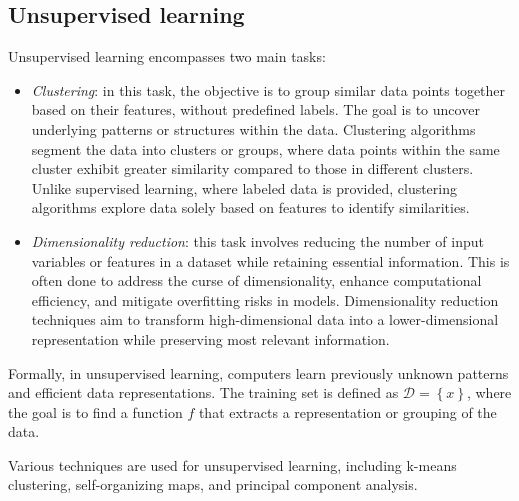 \subsection{Unsupervised learning}
Unsupervised learning encompasses two main tasks:
\begin{itemize}
    \item \textit{Clustering}: in this task, the objective is to group similar data points together based on their features, without predefined labels. 
        The goal is to uncover underlying patterns or structures within the data. 
        Clustering algorithms segment the data into clusters or groups, where data points within the same cluster exhibit greater similarity compared to those in different clusters. 
        Unlike supervised learning, where labeled data is provided, clustering algorithms explore data solely based on features to identify similarities.
    \item \textit{Dimensionality reduction}: this task involves reducing the number of input variables or features in a dataset while retaining essential information. 
        This is often done to address the curse of dimensionality, enhance computational efficiency, and mitigate overfitting risks in models. 
        Dimensionality reduction techniques aim to transform high-dimensional data into a lower-dimensional representation while preserving most relevant information.
\end{itemize}
Formally, in unsupervised learning, computers learn previously unknown patterns and efficient data representations.
The training set is defined as $\mathcal{D}=\left\{ x \right\}$, where the goal is to find a function $f$ that extracts a representation or grouping of the data.

Various techniques are used for unsupervised learning, including k-means clustering, self-organizing maps, and principal component analysis.

